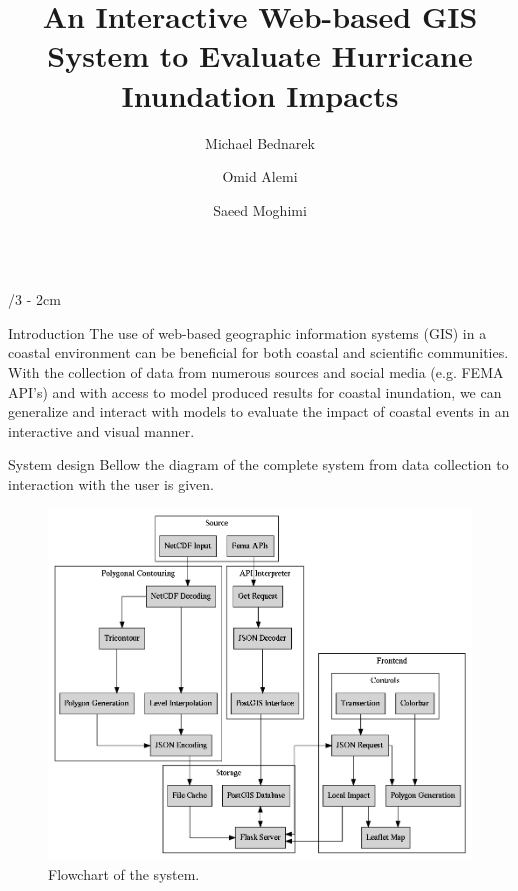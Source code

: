 \documentclass[landscape]{uioposter}
\title{An Interactive Web-based GIS System to Evaluate Hurricane Inundation Impacts}
\author
{%
    Michael Bednarek \inst{1}
    \and
    Omid Alemi \inst{2}
    \and
    Saeed Moghimi \inst{3}
}
\institute
{
    \inst{1}  Morristown Beard School (High school), 70 Whippany Rd, Morristown,
    NJ.\\
    \and
    \inst{2} School of Interactive Arts and Technology, Simon Fraser University,
    BC, Canada.\\
    \and
    \inst{3} NOAA National Ocean Service, Coast Survey Development Laboratory,
    Silver Spring, MD.\\
    
}
\begin{document}
\begin{frame}
\begin{columns}[onlytextwidth]




\begin{column}{\textwidth/3 - 2cm}
    
    \begin{block}{Introduction}
      The use of web-based geographic information systems (GIS) in a coastal
      environment can be beneﬁcial for both coastal and scientiﬁc communities.
      With the collection of data from numerous sources and social media (e.g.
      FEMA API’s) and with access to model produced results for coastal
      inundation, we can generalize and interact with models to evaluate the
      impact of coastal events in an interactive and visual manner.
    \end{block}


    \begin{block}{System design}
     Bellow the diagram of the complete system from data collection to
     interaction with the user is given.
    
      \begin{figure}
         \centering
         \includegraphics[scale=.9]{flowchart.png}
         \caption{Flowchart of the system.}   
      \end{figure}
    

\end{block}
\end{column}
\end{columns}
\end{frame}
\end{document}
